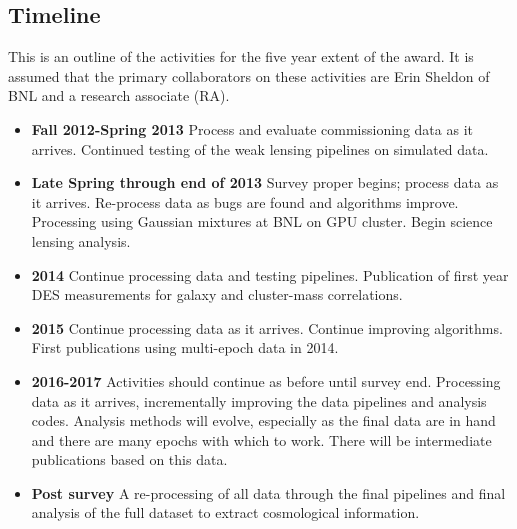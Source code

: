 \documentclass[12pt]{article}
\begin{document}
\clearpage
\newpage
\subsection{Timeline} \label{sec:timeline}

This is an outline of the activities for the five year extent of the award.  It
is assumed that the primary collaborators on these activities are Erin Sheldon
of BNL and a research associate (RA).

\begin{itemize}

\item {\bf Fall 2012-Spring 2013} Process and evaluate commissioning data as it
    arrives.  Continued testing of the weak lensing pipelines on simulated
    data.

\item {\bf Late Spring through end of 2013} Survey proper begins; process data
    as it arrives.  Re-process data as bugs are found and algorithms improve.
    Processing using Gaussian mixtures at BNL on GPU cluster.  Begin science
    lensing analysis.

\item {\bf 2014} Continue processing data and testing pipelines.  Publication
    of first year DES measurements for galaxy and cluster-mass correlations.

\item {\bf 2015} Continue processing data as it arrives.  Continue improving
    algorithms.   First publications using multi-epoch data in 2014.

\item {\bf 2016-2017}  Activities should continue as before until survey end.
    Processing data as it arrives, incrementally improving the data pipelines
    and analysis codes.  Analysis methods will evolve, especially as the final
    data are in hand and there are many epochs with which to work.   There will
    be intermediate publications based on this data.

\item {\bf Post survey} A re-processing of all data through the final pipelines
    and final analysis of the full dataset to extract cosmological information.


\end{itemize}







\newpage
{}
\end{document}

